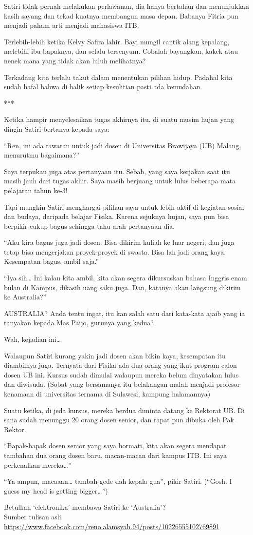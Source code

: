 Satiri tidak pernah melakukan perlawanan, dia hanya bertahan dan menunjukkan kasih sayang dan tekad kuatnya membangun masa depan. Babanya Fitria pun menjadi paham arti menjadi mahasiswa ITB.

Terlebih-lebih ketika Kelvy Safira lahir. Bayi mungil cantik alang kepalang, melebihi ibu-bapaknya, dan selalu tersenyum. Cobalah bayangkan, kakek atau nenek mana yang tidak akan luluh melihatnya?

Terkadang kita terlalu takut dalam menentukan pilihan hidup. Padahal kita sudah hafal bahwa di balik setiap kesulitian pasti ada kemudahan.

***

Ketika hampir menyelesaikan tugas akhirnya itu, di suatu musim hujan yang dingin Satiri bertanya kepada saya:

“Ren, ini ada tawaran untuk jadi dosen di Universitas Brawijaya (UB) Malang, menurutmu bagaimana?”

Saya terpukau juga atas pertanyaan itu. Sebab, yang saya kerjakan saat itu masih jauh dari tugas akhir. Saya masih berjuang untuk lulus beberapa mata pelajaran tahun ke-3!

Tapi mungkin Satiri menghargai pilihan saya untuk lebih aktif di kegiatan sosial dan budaya, daripada belajar Fisika. Karena sejuknya hujan, saya pun bisa berpikir cukup bagus sehingga tahu arah pertanyaan dia.

“Aku kira bagus juga jadi dosen. Bisa dikirim kuliah ke luar negeri, dan juga tetap bisa mengerjakan proyek-proyek di swasta. Bisa lah jadi orang kaya. Kesempatan bagus, ambil saja.”

“Iya sih… Ini kalau kita ambil, kita akan segera dikursuskan bahasa Inggris enam bulan di Kampus, dikasih uang saku juga. Dan, katanya akan langsung dikirim ke Australia?”

AUSTRALIA? Anda tentu ingat, itu kan salah satu dari kata-kata ajaib yang ia tanyakan kepada Mas Paijo, gurunya yang kedua?

Wah, kejadian ini…

Walaupun Satiri kurang yakin jadi dosen akan bikin kaya, kesempatan itu diambilnya juga. Ternyata dari Fisika ada dua orang yang ikut program calon dosen UB ini. Kursus sudah dimulai walaupun mereka belum dinyatakan lulus dan diwisuda. (Sobat yang bersamanya itu belakangan malah menjadi profesor kenamaan di universitas ternama di Sulawesi, kampung halamannya)

Suatu ketika, di jeda kursus, mereka berdua diminta datang ke Rektorat UB. Di sana sudah menunggu 20 orang dosen senior, dan rapat pun dibuka oleh Pak Rektor.

“Bapak-bapak dosen senior yang saya hormati, kita akan segera mendapat tambahan dua orang dosen baru, macan-macan dari kampus ITB. Ini saya perkenalkan mereka…”

“Ya ampun, macaaan… tambah gede dah kepala gua”, pikir Satiri. (“Gosh. I guess my head is getting bigger…”)

Betulkah ‘elektronika’ membawa Satiri ke ‘Australia’? 
\\[10pt]

Sumber tulisan asli \url{https://www.facebook.com/reno.alamsyah.94/posts/10226555102769891}

